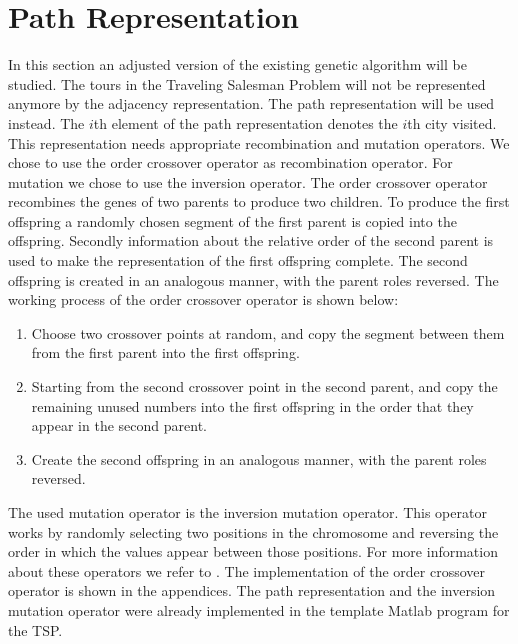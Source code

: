 

\section{Path Representation}

In this section an adjusted version of the existing genetic algorithm will be studied. The tours in the Traveling Salesman Problem will not be represented anymore by the adjacency representation. The path representation will be used instead. The $i$th element of the path representation denotes the $i$th city visited. This representation needs appropriate recombination and mutation operators. We chose to use the order crossover operator as recombination operator. For mutation we chose to use the inversion operator. 
\newline
\newline
The order crossover operator recombines the genes of two parents to produce two children. To produce the first offspring a randomly chosen segment of the first parent is copied into the offspring. Secondly information about the relative order of the second parent is used to make the representation of the first offspring complete. The second offspring is created in an analogous manner, with the parent roles reversed. The working process of the order crossover operator is shown below:

\begin{enumerate}
  \item Choose two crossover points at random, and copy the segment between them from the first parent into the first offspring.
  \item Starting from the second crossover point in the second parent, and copy the remaining unused numbers into the first offspring in the order that they appear in the second parent.
  \item Create the second offspring in an analogous manner, with the parent roles reversed.
\end{enumerate}

The used mutation operator is the inversion mutation operator. This operator works by randomly selecting two positions in the chromosome and reversing the order in which the values appear between those positions. For more information about these operators we refer to \cite{handboek}. The implementation of the order crossover operator is shown in the appendices. The path representation and the inversion mutation operator were already implemented in the template Matlab program for the TSP.
